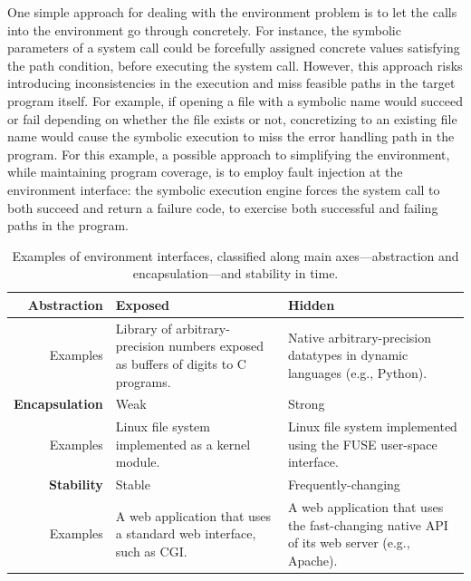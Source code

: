 One simple approach for dealing with the environment problem is to let the calls into the environment go through concretely.
%
For instance, the symbolic parameters of a system call could be forcefully assigned concrete values satisfying the path condition, before executing the system call.  However, this approach risks introducing inconsistencies in the execution and miss feasible paths in the target program itself.
%
For example, if opening a file with a symbolic name would succeed or fail depending on whether the file exists or not, concretizing to an existing file name would cause the symbolic execution to miss the error handling path in the program.
%
For this example, a possible approach to simplifying the environment, while maintaining program coverage, is to employ fault injection at the environment interface: the symbolic execution engine forces the system call to both succeed and return a failure code, to exercise both successful and failing paths in the program.

\newcommand{\cnineccolor}{\cellcolor{GreenYellow}}
\newcommand{\chefccolor}{\cellcolor{SkyBlue}}

\begin{table}
  \centering
  \small
  \begin{tabular}{r p{6cm} p{6cm}}
    
    \textbf{Abstraction} & \cnineccolor Exposed & \chefccolor Hidden \\
    \hline
    \bigskip Examples      & Library of arbitrary-precision numbers exposed as buffers of digits to C programs.     & Native arbitrary-precision datatypes in dynamic languages (e.g., Python). \\
    
    \textbf{Encapsulation} & \chefccolor Weak & \cnineccolor Strong \\
    \hline
    \bigskip Examples      & Linux file system implemented as a kernel module.   & Linux file system implemented using the FUSE user-space interface. \\
    
    \textbf{Stability}   & \cnineccolor Stable    & \chefccolor Frequently-changing \\
    \hline
        Examples          & A web application that uses a standard web interface, such as CGI.    & A web application that uses the fast-changing native API of its web server (e.g., Apache). \\
  \end{tabular}
  \caption{Examples of environment interfaces, classified along main axes---abstraction and encapsulation---and stability in time.
}
  \label{tab:intro:env}
\end{table}

